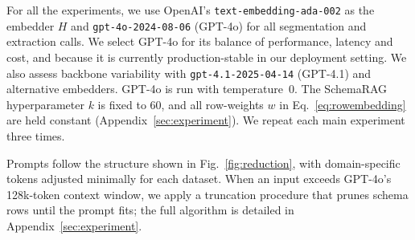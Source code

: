 \documentclass[11pt]{article}
\begin{document}

For all the experiments, we use OpenAI's \texttt{text-embedding-ada-002} \cite{openaiImprovedEmbedding} as the embedder $H$ and \texttt{gpt-4o-2024-08-06} (GPT-4o) \cite{openai2024gpt4o} for all segmentation and extraction calls. 
We select GPT-4o for its balance of performance, latency and cost, and because it is currently production-stable in our deployment setting.
We also assess backbone variability with \texttt{gpt-4.1-2025-04-14} (GPT-4.1) \cite{openai2025gpt41} and alternative embedders. %
GPT-4o is run with temperature~0.  
The SchemaRAG hyperparameter $k$ is fixed to 60, and all row-weights $w$ in Eq.~\ref{eq:rowembedding} are held constant (Appendix~\ref{sec:experiment}).
We repeat each main experiment three times. 

Prompts follow the structure shown in Fig.~\ref{fig:reduction}, with domain-specific tokens adjusted minimally for each dataset. 
When an input exceeds GPT-4o's 128k-token context window, we apply a truncation procedure that prunes schema rows until the prompt fits; the full algorithm is detailed in Appendix~\ref{sec:experiment}.
\end{document}
